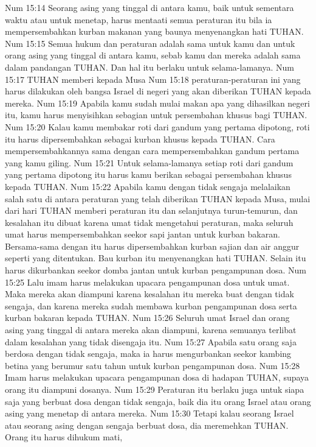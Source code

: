Num 15:14  Seorang asing yang tinggal di antara kamu, baik untuk sementara waktu atau untuk menetap, harus mentaati semua peraturan itu bila ia mempersembahkan kurban makanan yang baunya menyenangkan hati TUHAN.
Num 15:15  Semua hukum dan peraturan adalah sama untuk kamu dan untuk orang asing yang tinggal di antara kamu, sebab kamu dan mereka adalah sama dalam pandangan TUHAN. Dan hal itu berlaku untuk selama-lamanya.
Num 15:17  TUHAN memberi kepada Musa
Num 15:18  peraturan-peraturan ini yang harus dilakukan oleh bangsa Israel di negeri yang akan diberikan TUHAN kepada mereka.
Num 15:19  Apabila kamu sudah mulai makan apa yang dihasilkan negeri itu, kamu harus menyisihkan sebagian untuk persembahan khusus bagi TUHAN.
Num 15:20  Kalau kamu membakar roti dari gandum yang pertama dipotong, roti itu harus dipersembahkan sebagai kurban khusus kepada TUHAN. Cara mempersembahkannya sama dengan cara mempersembahkan gandum pertama yang kamu giling.
Num 15:21  Untuk selama-lamanya setiap roti dari gandum yang pertama dipotong itu harus kamu berikan sebagai persembahan khusus kepada TUHAN.
Num 15:22  Apabila kamu dengan tidak sengaja melalaikan salah satu di antara peraturan yang telah diberikan TUHAN kepada Musa, mulai dari hari TUHAN memberi peraturan itu dan selanjutnya turun-temurun, dan kesalahan itu dibuat karena umat tidak mengetahui peraturan, maka seluruh umat harus mempersembahkan seekor sapi jantan untuk kurban bakaran. Bersama-sama dengan itu harus dipersembahkan kurban sajian dan air anggur seperti yang ditentukan. Bau kurban itu menyenangkan hati TUHAN. Selain itu harus dikurbankan seekor domba jantan untuk kurban pengampunan dosa.
Num 15:25  Lalu imam harus melakukan upacara pengampunan dosa untuk umat. Maka mereka akan diampuni karena kesalahan itu mereka buat dengan tidak sengaja, dan karena mereka sudah membawa kurban pengampunan dosa serta kurban bakaran kepada TUHAN.
Num 15:26  Seluruh umat Israel dan orang asing yang tinggal di antara mereka akan diampuni, karena semuanya terlibat dalam kesalahan yang tidak disengaja itu.
Num 15:27  Apabila satu orang saja berdosa dengan tidak sengaja, maka ia harus mengurbankan seekor kambing betina yang berumur satu tahun untuk kurban pengampunan dosa.
Num 15:28  Imam harus melakukan upacara pengampunan dosa di hadapan TUHAN, supaya orang itu diampuni dosanya.
Num 15:29  Peraturan itu berlaku juga untuk siapa saja yang berbuat dosa dengan tidak sengaja, baik dia itu orang Israel atau orang asing yang menetap di antara mereka.
Num 15:30  Tetapi kalau seorang Israel atau seorang asing dengan sengaja berbuat dosa, dia meremehkan TUHAN. Orang itu harus dihukum mati,
